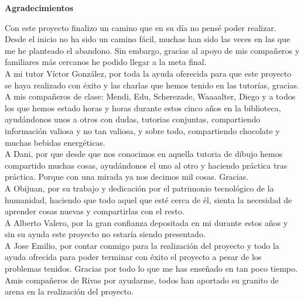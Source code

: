 \newpage{}
\thispagestyle{empty}
\begin{center}
    \Large
    \vspace{0.9cm}
    \textbf{Agradecimientos}
\end{center}

Con este proyecto finalizo un camino que en su día no pensé poder realizar. Desde el inicio no ha sido un camino fácil, muchas han sido las veces en las que me he planteado el abandono. Sin embargo, gracias al apoyo de mis compañeros y familiares más cercanos he podido llegar a la meta final.\\

A mi tutor Víctor González, por toda la ayuda oferecida para que este proyecto se haya realizado con éxito y las charlas que hemos tenido en las tutorías, gracias.\\

A mis compañeros de clase: Mendi, Edu, Scherezade, Waaaalter, Diego y a todos los que hemos estado horas y horas durante estos cinco años en la biblioteca, ayudándonos unos a otros con dudas, tutorias conjuntas, compartiendo información valiosa y no tan valiosa, y sobre todo, compartiendo chocolate y muchas bebidas energéticas. \\

A Dani, por que desde que nos conocimos en aquella tutoria de dibujo hemos compartido muchas cosas, ayudándonos el uno al otro y haciendo práctica tras práctica. Porque con una mirada ya nos decimos mil cosas. Gracias.\\

A Obijuan, por su trabajo y dedicación por el patrimonio tecnológico de la humanidad, haciendo que todo aquel que esté cerca de él, sienta la necesidad de aprender cosas nuevas y compartirlas con el resto.\\

A Alberto Valero, por la gran confianza depositada en mi durante estos años y sin su ayuda este proyecto no estaría siendo presentado.\\

A Jose Emilio, por contar conmigo para la realización del proyecto y todo la ayuda ofrecida para poder terminar con éxito el proyecto a pesar de los problemas tenidos. Gracias por todo lo que me has enseñado en tan poco tiempo.\\

Amis compañeros de Rivas por ayudarme, todos han aportado su granito de arena en la realización del proyecto.\\

